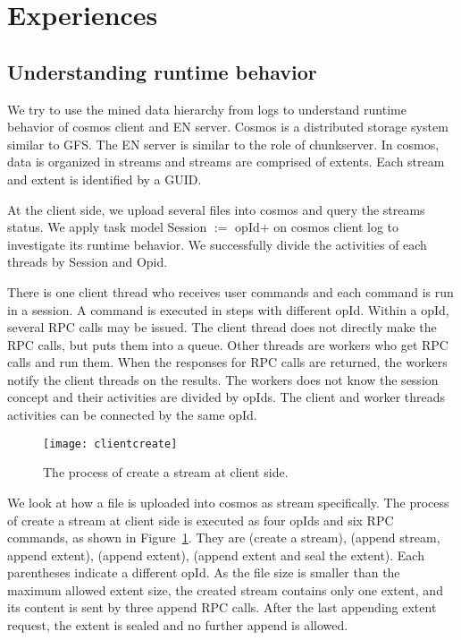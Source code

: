 
\section{Experiences}
\label{sec:exp}


\subsection{Understanding runtime behavior}

We try to use the mined data hierarchy from logs to
understand runtime behavior of cosmos client and EN server.
Cosmos is a distributed storage system similar to GFS. The
EN server is similar to the role of chunkserver. In cosmos,
data is organized in streams and streams are comprised of
extents. Each stream and extent is identified by a GUID.

At the client side, we upload several files into cosmos and
query the streams status. We apply task model Session $:=$
opId$+$ on cosmos client log to investigate its runtime
behavior. We successfully divide the activities of each
threads by Session and Opid.

There is one client thread who receives user commands and
each command is run in a session. A command is executed in
steps with different opId. Within a opId,  several RPC calls
may be issued. The client thread does not directly make the
RPC calls, but puts them into a queue. Other threads are
workers who get RPC calls and run them. When the responses
for RPC calls are returned, the workers notify the client
threads on the results. The workers does not know the
session concept and their activities are divided by opIds.
The client and worker threads activities can be connected by
the same opId.

\begin{figure}
\centering
\texttt{[image: clientcreate]}
\caption{The process of create a stream at client side.}
\label{fig:clientcreate}
\end{figure}

We look at how a file is uploaded into cosmos as stream
specifically. The process of create a stream at client side
is executed as four opIds and six RPC commands, as shown in
Figure~\ref{fig:clientcreate}. They are (create a stream),
(append stream, append extent), (append extent), (append
extent and seal the extent). Each parentheses indicate a
different opId. As the file size is smaller than the maximum
allowed extent size, the created stream contains only one
extent, and its content is sent by three append RPC calls.
After the last appending extent request, the extent is
sealed and no further append is allowed.


